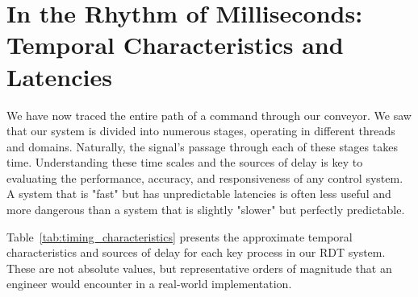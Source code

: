 








\section{In the Rhythm of Milliseconds: Temporal Characteristics and Latencies}
\label{sec:timing_and_latency}

We have now traced the entire path of a command through our conveyor. We saw that our system is divided into numerous stages, operating in different threads and domains. Naturally, the signal's passage through each of these stages takes time. Understanding these time scales and the sources of delay is key to evaluating the performance, accuracy, and responsiveness of any control system. A system that is "fast" but has unpredictable latencies is often less useful and more dangerous than a system that is slightly "slower" but perfectly predictable.

Table~\ref{tab:timing_characteristics} presents the approximate temporal characteristics and sources of delay for each key process in our RDT system. These are not absolute values, but representative orders of magnitude that an engineer would encounter in a real-world implementation.

\usepackage{multirow} %

